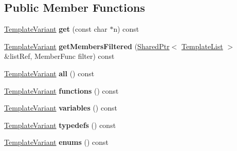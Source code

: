 \subsection*{Public Member Functions}
\begin{DoxyCompactItemize}
\item 
\mbox{\label{class_globals_index_context_1_1_private_af282d9d6d82789dda7b8735d8656161f}} 
\mbox{\hyperlink{class_template_variant}{Template\+Variant}} {\bfseries get} (const char $\ast$n) const
\item 
\mbox{\label{class_globals_index_context_1_1_private_a6c4b76d3aaaeffd9260eda93946f314b}} 
\mbox{\hyperlink{class_template_variant}{Template\+Variant}} {\bfseries get\+Members\+Filtered} (\mbox{\hyperlink{class_shared_ptr}{Shared\+Ptr}}$<$ \mbox{\hyperlink{class_template_list}{Template\+List}} $>$ \&list\+Ref, Member\+Func filter) const
\item 
\mbox{\label{class_globals_index_context_1_1_private_a49f5d4a693a8191244b918914c721762}} 
\mbox{\hyperlink{class_template_variant}{Template\+Variant}} {\bfseries all} () const
\item 
\mbox{\label{class_globals_index_context_1_1_private_a0f6b2816b18671923505778563703242}} 
\mbox{\hyperlink{class_template_variant}{Template\+Variant}} {\bfseries functions} () const
\item 
\mbox{\label{class_globals_index_context_1_1_private_a97d804a112b967604821931d7bea98a4}} 
\mbox{\hyperlink{class_template_variant}{Template\+Variant}} {\bfseries variables} () const
\item 
\mbox{\label{class_globals_index_context_1_1_private_a6baffe0f9de0ede9df765de0a850b3cd}} 
\mbox{\hyperlink{class_template_variant}{Template\+Variant}} {\bfseries typedefs} () const
\item 
\mbox{\label{class_globals_index_context_1_1_private_a36e16c99d4035814270d64062deb809e}} 
\mbox{\hyperlink{class_template_variant}{Template\+Variant}} {\bfseries enums} () const

\end{DoxyCompactItemize}
